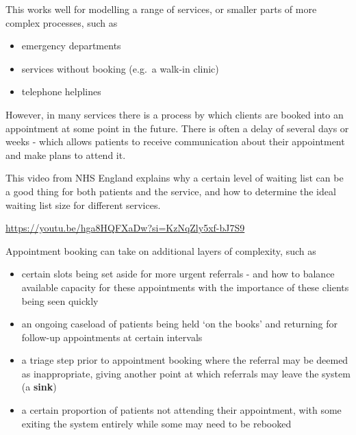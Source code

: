 \documentclass[
  letterpaper,
  DIV=11,
  numbers=noendperiod]{scrreprt}
\providecommand{\tightlist}{%
  \setlength{\itemsep}{0pt}\setlength{\parskip}{0pt}}\usepackage{longtable,booktabs,array}
\begin{document}
This works well for modelling a range of services, or smaller parts of
more complex processes, such as

\begin{itemize}
\tightlist
\item
  emergency departments
\item
  services without booking (e.g.~a walk-in clinic)
\item
  telephone helplines
\end{itemize}

However, in many services there is a process by which clients are booked
into an appointment at some point in the future. There is often a delay
of several days or weeks - which allows patients to receive
communication about their appointment and make plans to attend it.

\begin{tcolorbox}[enhanced jigsaw, colframe=quarto-callout-note-color-frame, bottomtitle=1mm, breakable, rightrule=.15mm, coltitle=black, colbacktitle=quarto-callout-note-color!10!white, opacityback=0, leftrule=.75mm, arc=.35mm, toptitle=1mm, title=\textcolor{quarto-callout-note-color}{\faInfo}\hspace{0.5em}{Note}, titlerule=0mm, colback=white, toprule=.15mm, bottomrule=.15mm, left=2mm, opacitybacktitle=0.6]

This video from NHS England explains why a certain level of waiting list
can be a good thing for both patients and the service, and how to
determine the ideal waiting list size for different services.

\url{https://youtu.be/hga8HQFXaDw?si=KzNqZly5xf-bJ7S9}

\end{tcolorbox}

Appointment booking can take on additional layers of complexity, such as

\begin{itemize}
\tightlist
\item
  certain slots being set aside for more urgent referrals - and how to
  balance available capacity for these appointments with the importance
  of these clients being seen quickly
\item
  an ongoing caseload of patients being held `on the books' and
  returning for follow-up appointments at certain intervals
\item
  a triage step prior to appointment booking where the referral may be
  deemed as inappropriate, giving another point at which referrals may
  leave the system (a \textbf{sink})
\item
  a certain proportion of patients not attending their appointment, with
  some exiting the system entirely while some may need to be rebooked
\end{itemize}
\end{document}
